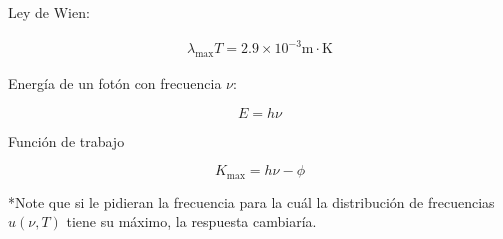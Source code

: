 \documentclass[12pt]{article}
\begin{document}
Ley de Wien:



\begin{align*}
\lambda_{\text{max}} T = 2.9 \times 10^{-3} \text{m} \cdot \text{K}
\end{align*}


Energía de un fotón con frecuencia $\nu$:


\begin{equation*}
E  = h \nu 
\end{equation*}


Función de trabajo

\begin{equation*}
K_{\text{max}} = h \nu - \phi
\end{equation*}


*Note que si le pidieran la frecuencia para la cuál la distribución de frecuencias $u(\nu,T)$ tiene su máximo, la respuesta cambiaría.
\end{document}
